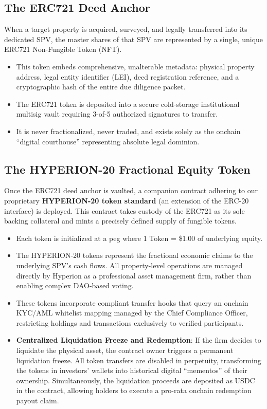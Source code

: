 \documentclass[11pt]{article}
\begin{document}
\subsection{The ERC721 Deed Anchor}
When a target property is acquired, surveyed, and legally transferred into its dedicated SPV, the master shares of that SPV are represented by a single, unique ERC721 Non-Fungible Token (NFT). 
\begin{itemize}
    \item This token embeds comprehensive, unalterable metadata: physical property address, legal entity identifier (LEI), deed registration reference, and a cryptographic hash of the entire due diligence packet.
    \item The ERC721 token is deposited into a secure cold-storage institutional multisig vault requiring 3-of-5 authorized signatures to transfer.
    \item It is never fractionalized, never traded, and exists solely as the onchain ``digital courthouse'' representing absolute legal dominion.
\end{itemize}

\subsection{The HYPERION-20 Fractional Equity Token}
Once the ERC721 deed anchor is vaulted, a companion contract adhering to our proprietary \textbf{HYPERION-20 token standard} (an extension of the ERC-20 interface) is deployed. This contract takes custody of the ERC721 as its sole backing collateral and mints a precisely defined supply of fungible tokens.
\begin{itemize}
    \item Each token is initialized at a peg where 1 Token = \$1.00 of underlying equity.
    \item The HYPERION-20 tokens represent the fractional economic claims to the underlying SPV's cash flows. All property-level operations are managed directly by Hyperion as a professional asset management firm, rather than enabling complex DAO-based voting.
    \item These tokens incorporate compliant transfer hooks that query an onchain KYC/AML whitelist mapping managed by the Chief Compliance Officer, restricting holdings and transactions exclusively to verified participants.
    \item \textbf{Centralized Liquidation Freeze and Redemption}: If the firm decides to liquidate the physical asset, the contract owner triggers a permanent liquidation freeze. All token transfers are disabled in perpetuity, transforming the tokens in investors' wallets into historical digital ``mementos'' of their ownership. Simultaneously, the liquidation proceeds are deposited as USDC in the contract, allowing holders to execute a pro-rata onchain redemption payout claim.
\end{itemize}
\end{document}

